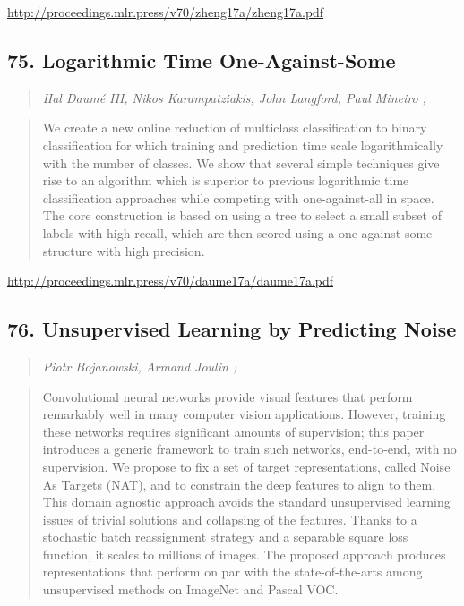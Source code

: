 \documentclass{article}
\begin{document}
\href{http://proceedings.mlr.press/v70/zheng17a/zheng17a.pdf}{http://proceedings.mlr.press/v70/zheng17a/zheng17a.pdf}

\subsection{75. Logarithmic Time One-Against-Some}

\begin{quote}
\footnotesize{\textit{Hal Daumé III, Nikos Karampatziakis, John Langford, Paul Mineiro ;}}
\end{quote}

\begin{quote}
    We create a new online reduction of multiclass classification to binary classification for which training and prediction time scale logarithmically with the number of classes. We show that several simple techniques give rise to an algorithm which is superior to previous logarithmic time classification approaches while competing with one-against-all in space. The core construction is based on using a tree to select a small subset of labels with high recall, which are then scored using a one-against-some structure with high precision.  \end{quote}

\href{http://proceedings.mlr.press/v70/daume17a/daume17a.pdf}{http://proceedings.mlr.press/v70/daume17a/daume17a.pdf}

\subsection{76. Unsupervised Learning by Predicting Noise}

\begin{quote}
\footnotesize{\textit{Piotr Bojanowski, Armand Joulin ;}}
\end{quote}

\begin{quote}
    Convolutional neural networks provide visual features that perform remarkably well in many computer vision applications. However, training these networks requires significant amounts of supervision; this paper introduces a generic framework to train such networks, end-to-end, with no supervision. We propose to fix a set of target representations, called Noise As Targets (NAT), and to constrain the deep features to align to them. This domain agnostic approach avoids the standard unsupervised learning issues of trivial solutions and collapsing of the features. Thanks to a stochastic batch reassignment strategy and a separable square loss function, it scales to millions of images. The proposed approach produces representations that perform on par with the state-of-the-arts among unsupervised methods on ImageNet and Pascal VOC.  \end{quote}
\end{document}
